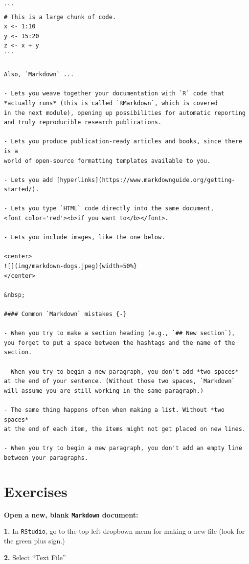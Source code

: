 \documentclass[
]{book}
\begin{document}
\begin{verbatim}
```
# This is a large chunk of code. 
x <- 1:10
y <- 15:20
z <- x + y
```

Also, `Markdown` ...  

- Lets you weave together your documentation with `R` code that
*actually runs* (this is called `RMarkdown`, which is covered
in the next module), opening up possibilities for automatic reporting
and truly reproducible research publications.  

- Lets you produce publication-ready articles and books, since there is a
world of open-source formatting templates available to you.  

- Lets you add [hyperlinks](https://www.markdownguide.org/getting-started/).  

- Lets you type `HTML` code directly into the same document, 
<font color='red'><b>if you want to</b></font>. 

- Lets you include images, like the one below.  

<center>
![](img/markdown-dogs.jpeg){width=50%}
</center>

&nbsp;  

#### Common `Markdown` mistakes {-}

- When you try to make a section heading (e.g., `## New section`),
you forget to put a space between the hashtags and the name of the section.  

- When you try to begin a new paragraph, you don't add *two spaces*
at the end of your sentence. (Without those two spaces, `Markdown`
will assume you are still working in the same paragraph.) 

- The same thing happens often when making a list. Without *two spaces*
at the end of each item, the items might not get placed on new lines.  

- When you try to begin a new paragraph, you don't add an empty line
between your paragraphs.  
\end{verbatim}

\hypertarget{exercises-7}{%
\section*{Exercises}\label{exercises-7}}

\textbf{Open a new, blank \texttt{Markdown} document:}

\textbf{1.} In \texttt{RStudio}, go to the top left dropbown menu for making a new file (look for the green plus sign.)

\textbf{2.} Select ``Text File''
\end{document}
